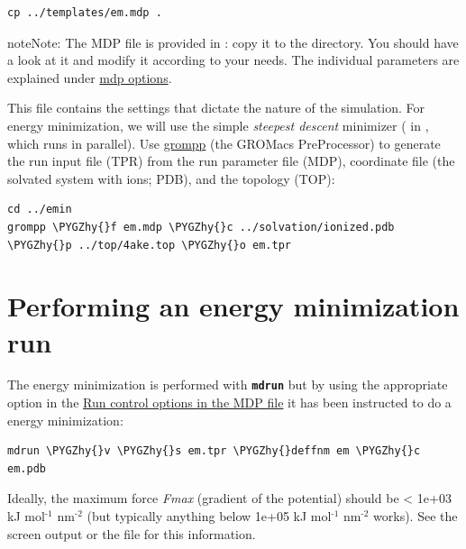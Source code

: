 \documentclass[letterpaper,10pt,english]{sphinxmanual}
\def\PYGZhy{\char`\-}
\begin{document}
\begin{Verbatim}[commandchars=\\\{\}]
cp ../templates/em.mdp .
\end{Verbatim}

\begin{notice}{note}{Note:}
The MDP file  is provided in
: copy it to the 
directory. You should have a look at it and modify it according to
your needs. The individual parameters are explained under \href{http://manual.gromacs.org/current/online/mdp\_opt.html}{mdp
options}.
\end{notice}

This  file contains the settings that dictate the nature of the
simulation. For energy minimization, we will use the simple \emph{steepest
descent} minimizer ( in , which runs in
parallel). Use \href{http://manual.gromacs.org/current/online/grompp.html}{grompp} (the GROMacs PreProcessor) to generate the run
input file (TPR) from the run parameter file (MDP), coordinate file
(the solvated system with ions; PDB), and the topology (TOP):

\begin{Verbatim}[commandchars=\\\{\}]
cd ../emin
grompp \PYGZhy{}f em.mdp \PYGZhy{}c ../solvation/ionized.pdb \PYGZhy{}p ../top/4ake.top \PYGZhy{}o em.tpr
\end{Verbatim}


\section{Performing an energy minimization run}
\label{energy_minimization:performing-an-energy-minimization-run}
The energy minimization is performed with \textbf{\texttt{mdrun}} but by
using the appropriate  option in the \href{http://manual.gromacs.org/current/online/mdp\_opt.html\#run}{Run control
options in the MDP file} it has been instructed to do a energy
minimization:

\begin{Verbatim}[commandchars=\\\{\}]
mdrun \PYGZhy{}v \PYGZhy{}s em.tpr \PYGZhy{}deffnm em \PYGZhy{}c em.pdb
\end{Verbatim}

Ideally, the maximum force \emph{Fmax} (gradient of the potential) should
be \textless{} 1e+03 kJ mol$^{\text{-1}}$ nm$^{\text{-2}}$ (but typically anything below 1e+05
kJ mol$^{\text{-1}}$ nm$^{\text{-2}}$ works). See the screen output or the  file for
this information.
\end{document}
